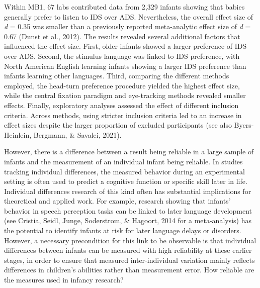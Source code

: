 \documentclass[
  man,floatsintext]{apa6}
\begin{document}
Within MB1, 67 labs contributed data from 2,329 infants showing that babies generally prefer to listen to IDS over ADS.
Nevertheless, the overall effect size of \emph{d} = 0.35 was smaller than a previously reported meta-analytic effect size of \emph{d} = 0.67 (Dunst et al., 2012).
The results revealed several additional factors that influenced the effect size.
First, older infants showed a larger preference of IDS over ADS.
Second, the stimulus language was linked to IDS preference, with North American English learning infants showing a larger IDS preference than infants learning other languages.
Third, comparing the different methods employed, the head-turn preference procedure yielded the highest effect size, while the central fixation paradigm and eye-tracking methods revealed smaller effects.
Finally, exploratory analyses assessed the effect of different inclusion criteria.
Across methods, using stricter inclusion criteria led to an increase in effect sizes despite the larger proportion of excluded participants (see also Byers-Heinlein, Bergmann, \& Savalei, 2021).

However, there is a difference between a result being reliable in a large sample of infants and the measurement of an individual infant being reliable.
In studies tracking individual differences, the measured behavior during an experimental setting is often used to predict a cognitive function or specific skill later in life.
Individual differences research of this kind often has substantial implications for theoretical and applied work.
For example, research showing that infants' behavior in speech perception tasks can be linked to later language development (see Cristia, Seidl, Junge, Soderstrom, \& Hagoort, 2014 for a meta-analysis) has the potential to identify infants at risk for later language delays or disorders.
However, a necessary precondition for this link to be observable is that individual differences between infants can be measured with high reliability at these earlier stages, in order to ensure that measured inter-individual variation mainly reflects differences in children's abilities rather than measurement error.
How reliable are the measures used in infancy research?
\end{document}

